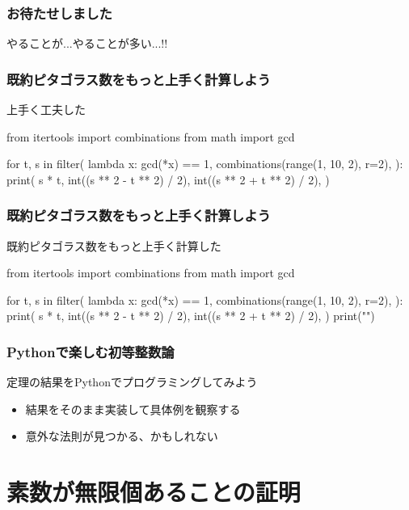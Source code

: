 \documentclass[dvipdfmx,11pt,notheorems]{beamer}
\theoremstyle{definition}
\begin{document}
\begin{frame}\frametitle{お待たせしました}
\huge{やることが...やることが多い...!!}
\end{frame}


\begin{frame}[fragile]\frametitle{既約ピタゴラス数をもっと上手く計算しよう}

\begin{block}{上手く工夫した}
\begin{pyverbatim}
from itertools import combinations
from math import gcd

for t, s in filter(
    lambda x: gcd(*x) == 1,
    combinations(range(1, 10, 2), r=2),
):
    print(
        s * t,
        int((s ** 2 - t ** 2) / 2),
        int((s ** 2 + t ** 2) / 2),
    )
\end{pyverbatim}
\end{block}

\end{frame}

\begin{frame}[fragile]\frametitle{既約ピタゴラス数をもっと上手く計算しよう}

\begin{block}{既約ピタゴラス数をもっと上手く計算した}
\begin{pycode}
from itertools import combinations
from math import gcd

for t, s in filter(
    lambda x: gcd(*x) == 1,
    combinations(range(1, 10, 2), r=2),
):
    print(
        s * t,
        int((s ** 2 - t ** 2) / 2),
        int((s ** 2 + t ** 2) / 2),
    )
    print("\n")
\end{pycode}
\end{block}

\end{frame}

\begin{frame}\frametitle{Pythonで楽しむ初等整数論}

\begin{block}{定理の結果をPythonでプログラミングしてみよう}
\begin{itemize}
\item 結果をそのまま実装して具体例を観察する
\item 意外な法則が見つかる、かもしれない
\end{itemize}
\end{block}

\end{frame}

\section{素数が無限個あることの証明}
\end{document}
